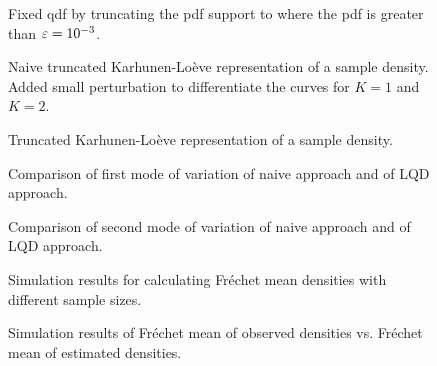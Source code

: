 \begin{figure}[h]
    \centering
    
    \caption{Fixed qdf by truncating the pdf support to where the pdf is greater than
    $\varepsilon = \nobreak 10^{-3}$.}
    \label{fig:fixed_qdf}
\end{figure}

\begin{figure}[h]
    \centering
    
    \caption{Naive truncated Karhunen-Loève representation of a sample density. Added
    small perturbation to differentiate the curves for $K=1$ and $K=2$.}
    \label{fig:naive_trunc_rep}
\end{figure}

\begin{figure}[h]
    \centering
    
    \caption{Truncated Karhunen-Loève representation of a sample density.}
    \label{fig:trunc_rep}
\end{figure}

\begin{figure}[h]
    \centering
    
    \caption{Comparison of first mode of variation of naive approach and of LQD approach.}
    \label{fig:1st_modes}
\end{figure}

\begin{figure}[h]
    \centering
    
    \caption{Comparison of second mode of variation of naive approach and of LQD approach.}
    \label{fig:2nd_modes}
\end{figure}

\begin{figure}[h]
    \centering
    
    \caption{Simulation results for calculating Fréchet mean densities with different
    sample sizes.}
    \label{fig:sim_f_mean}
\end{figure}

\begin{figure}[h]
    \centering
    
    \caption{Simulation results of Fréchet mean of observed densities vs.
    Fréchet mean of estimated densities.}
    \label{fig:sim_f_denstimation}
\end{figure}

